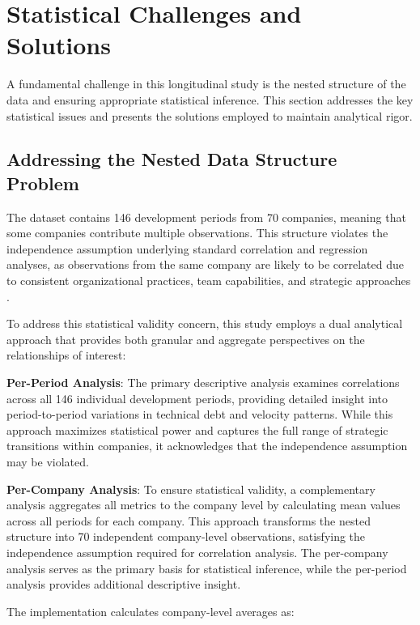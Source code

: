 \section{Statistical Challenges and Solutions}\label{sec:statistical_challenges}

A fundamental challenge in this longitudinal study is the nested structure of the data and ensuring appropriate statistical inference. This section addresses the key statistical issues and presents the solutions employed to maintain analytical rigor.

\subsection{Addressing the Nested Data Structure Problem}

The dataset contains 146 development periods from 70 companies, meaning that some companies contribute multiple observations. This structure violates the independence assumption underlying standard correlation and regression analyses, as observations from the same company are likely to be correlated due to consistent organizational practices, team capabilities, and strategic approaches \citep{raudenbush2002hierarchical}.

To address this statistical validity concern, this study employs a dual analytical approach that provides both granular and aggregate perspectives on the relationships of interest:

\textbf{Per-Period Analysis}: The primary descriptive analysis examines correlations across all 146 individual development periods, providing detailed insight into period-to-period variations in technical debt and velocity patterns. While this approach maximizes statistical power and captures the full range of strategic transitions within companies, it acknowledges that the independence assumption may be violated.

\textbf{Per-Company Analysis}: To ensure statistical validity, a complementary analysis aggregates all metrics to the company level by calculating mean values across all periods for each company. This approach transforms the nested structure into 70 independent company-level observations, satisfying the independence assumption required for correlation analysis. The per-company analysis serves as the primary basis for statistical inference, while the per-period analysis provides additional descriptive insight.

The implementation calculates company-level averages as:

